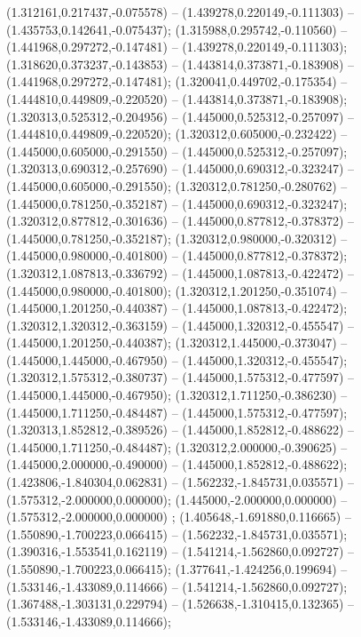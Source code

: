  (1.312161,0.217437,-0.075578) -- (1.439278,0.220149,-0.111303) -- (1.435753,0.142641,-0.075437);
 (1.315988,0.295742,-0.110560) -- (1.441968,0.297272,-0.147481) -- (1.439278,0.220149,-0.111303);
 (1.318620,0.373237,-0.143853) -- (1.443814,0.373871,-0.183908) -- (1.441968,0.297272,-0.147481);
 (1.320041,0.449702,-0.175354) -- (1.444810,0.449809,-0.220520) -- (1.443814,0.373871,-0.183908);
 (1.320313,0.525312,-0.204956) -- (1.445000,0.525312,-0.257097) -- (1.444810,0.449809,-0.220520);
 (1.320312,0.605000,-0.232422) -- (1.445000,0.605000,-0.291550) -- (1.445000,0.525312,-0.257097);
 (1.320313,0.690312,-0.257690) -- (1.445000,0.690312,-0.323247) -- (1.445000,0.605000,-0.291550);
 (1.320312,0.781250,-0.280762) -- (1.445000,0.781250,-0.352187) -- (1.445000,0.690312,-0.323247);
 (1.320312,0.877812,-0.301636) -- (1.445000,0.877812,-0.378372) -- (1.445000,0.781250,-0.352187);
 (1.320312,0.980000,-0.320312) -- (1.445000,0.980000,-0.401800) -- (1.445000,0.877812,-0.378372);
 (1.320312,1.087813,-0.336792) -- (1.445000,1.087813,-0.422472) -- (1.445000,0.980000,-0.401800);
 (1.320312,1.201250,-0.351074) -- (1.445000,1.201250,-0.440387) -- (1.445000,1.087813,-0.422472);
 (1.320312,1.320312,-0.363159) -- (1.445000,1.320312,-0.455547) -- (1.445000,1.201250,-0.440387);
 (1.320312,1.445000,-0.373047) -- (1.445000,1.445000,-0.467950) -- (1.445000,1.320312,-0.455547);
 (1.320312,1.575312,-0.380737) -- (1.445000,1.575312,-0.477597) -- (1.445000,1.445000,-0.467950);
 (1.320312,1.711250,-0.386230) -- (1.445000,1.711250,-0.484487) -- (1.445000,1.575312,-0.477597);
 (1.320313,1.852812,-0.389526) -- (1.445000,1.852812,-0.488622) -- (1.445000,1.711250,-0.484487);
 (1.320312,2.000000,-0.390625) -- (1.445000,2.000000,-0.490000) -- (1.445000,1.852812,-0.488622);
 (1.423806,-1.840304,0.062831) -- (1.562232,-1.845731,0.035571) -- (1.575312,-2.000000,0.000000);
 (1.445000,-2.000000,0.000000) -- (1.575312,-2.000000,0.000000) ;
 (1.405648,-1.691880,0.116665) -- (1.550890,-1.700223,0.066415) -- (1.562232,-1.845731,0.035571);
 (1.390316,-1.553541,0.162119) -- (1.541214,-1.562860,0.092727) -- (1.550890,-1.700223,0.066415);
 (1.377641,-1.424256,0.199694) -- (1.533146,-1.433089,0.114666) -- (1.541214,-1.562860,0.092727);
 (1.367488,-1.303131,0.229794) -- (1.526638,-1.310415,0.132365) -- (1.533146,-1.433089,0.114666);

